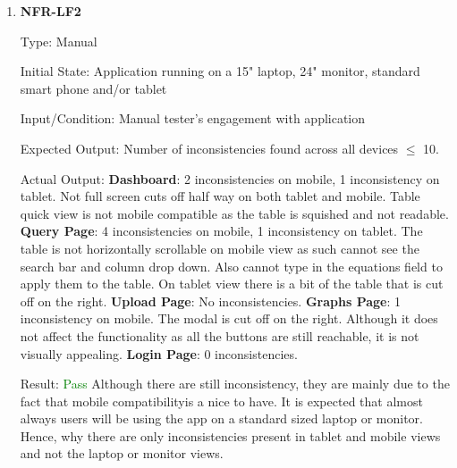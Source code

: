 \documentclass[12pt, titlepage]{article}
\begin{document}
\begin{enumerate}
\item{\textbf{NFR-LF2}} \label{NFR:LF2}

Type: Manual

Initial State: Application running on a 15" laptop, 24" monitor, standard smart
phone and/or tablet

Input/Condition: Manual tester's engagement with application

Expected Output: Number of inconsistencies found across all devices $\leq$ 10.

Actual Output: \newline
\textbf{Dashboard}: 2 inconsistencies on mobile, 1 inconsistency on tablet. Not
full screen cuts off half way on both tablet and mobile. Table quick view is not
mobile compatible as the table is squished and not readable.\newline
\textbf{Query Page}: 4 inconsistencies on mobile, 1 inconsistency on tablet. The
table is not horizontally scrollable on mobile view as such cannot see the
search bar and column drop down. Also cannot type in the equations field to
apply them to the table. On tablet view there is a bit of the table that is cut
off on the right. \newline
\textbf{Upload Page}: No inconsistencies.\newline
\textbf{Graphs Page}: 1 inconsistency on mobile. The modal is cut off on the
right. Although it does not affect the functionality as all the buttons are
still reachable, it is not visually appealing. \newline
\textbf{Login Page}: 0 inconsistencies.

Result: \textcolor{green}{Pass} \newline
Although there are still inconsistency, they are mainly due to the fact that
mobile compatibilityis a nice to have. It is expected that almost always users
will be using the app on a standard sized laptop or monitor. Hence, why there
are only inconsistencies present in tablet and mobile views and not the laptop
or monitor views. \end{enumerate}
\end{document}
